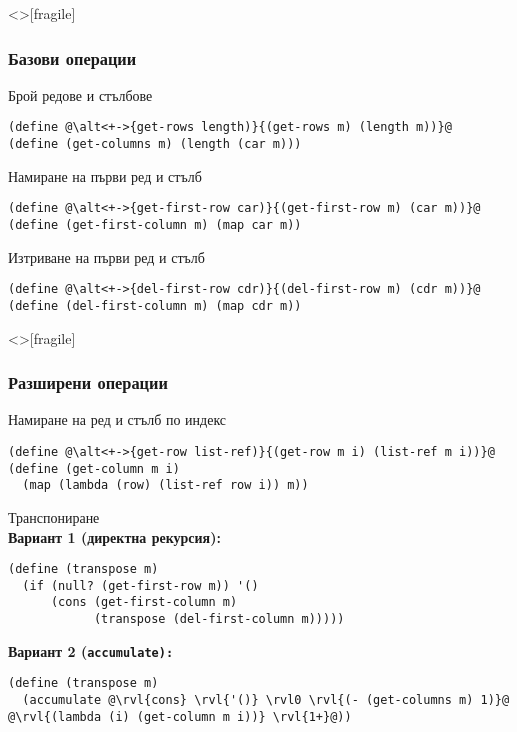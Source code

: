 \documentclass[alsotrans,beameroptions={aspectratio=169}]{beamerswitch}
\begin{document}
\begin{frame}<>[fragile]
  \frametitle{Базови операции}

  Брой редове и стълбове
  \pause
  \onslide<+->
\begin{lstlisting}
(define @\alt<+->{get-rows length)}{(get-rows m) (length m))}@
(define (get-columns m) (length (car m)))
\end{lstlisting}
  \onslide<+->
  Намиране на първи ред и стълб
  \onslide<+->
\begin{lstlisting}
(define @\alt<+->{get-first-row car)}{(get-first-row m) (car m))}@
(define (get-first-column m) (map car m))
\end{lstlisting}
  \onslide<+->
  Изтриване на първи ред и стълб
  \onslide<+->
\begin{lstlisting}
(define @\alt<+->{del-first-row cdr)}{(del-first-row m) (cdr m))}@
(define (del-first-column m) (map cdr m))
\end{lstlisting}
\end{frame}

\begin{frame}<>[fragile]
  \frametitle{Разширени операции}

  Намиране на ред и стълб по индекс
  \pause
  \onslide<+->
\begin{lstlisting}
(define @\alt<+->{get-row list-ref)}{(get-row m i) (list-ref m i))}@
(define (get-column m i)
  (map (lambda (row) (list-ref row i)) m))
\end{lstlisting}
  \pause
  Транспониране\\
  \pause
  \onslide<+->
  \textbf{Вариант 1 (директна рекурсия):}
\begin{lstlisting}
(define (transpose m)
  (if (null? (get-first-row m)) '()
      (cons (get-first-column m)
            (transpose (del-first-column m)))))
\end{lstlisting}
  \onslide<+->

 \textbf{Вариант 2 (\tt{accumulate}):}
  \begin{overprint}
\begin{lstlisting}
(define (transpose m)
  (accumulate @\rvl{cons} \rvl{'()} \rvl0 \rvl{(- (get-columns m) 1)}@ @\rvl{(lambda (i) (get-column m i))} \rvl{1+}@))
\end{lstlisting}
  \end{overprint}
\end{frame}
\end{document}
